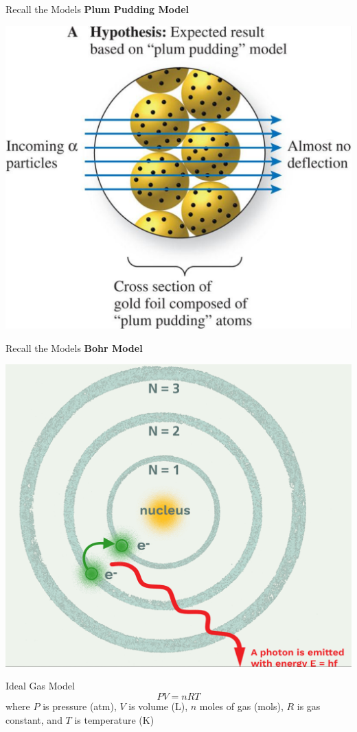 \documentclass[11pt]{beamer}
\begin{document}
\begin{frame}{Recall the Models}
  \textbf{Plum Pudding Model}
  \centering
  
  \includegraphics[width=0.7\linewidth]{test_hypothesis}
\end{frame}

\begin{frame}{Recall the Models}
  \centering
  \textbf{Bohr Model}

  \includegraphics[width=0.7\linewidth]{bohr_model}
\end{frame}

\begin{frame}{Ideal Gas Model}
  \begin{equation}
    PV = nRT
  \end{equation}
  where $P$ is pressure (atm), $V$ is volume (L), $n$ moles of gas (mols),
  $R$ is gas constant, and $T$ is temperature (K)

\end{frame}
\end{document}
